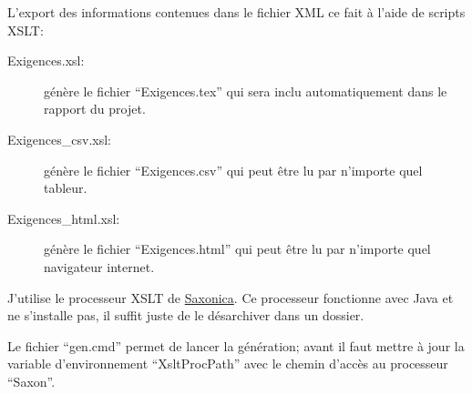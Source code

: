 \documentclass[11pt,a4paper,french,twoside,openright]{article}
\begin{document}
L'export des informations contenues dans le fichier XML ce fait à l'aide de scripts XSLT:
\begin{description}
\item[Exigences.xsl:] génère le fichier \enquote{Exigences.tex} qui sera inclu automatiquement dans le rapport du projet.
\item[Exigences\_csv.xsl:] génère le fichier \enquote{Exigences.csv} qui peut être lu par n'importe quel tableur.
\item[Exigences\_html.xsl:] génère le fichier \enquote{Exigences.html} qui peut être lu par n'importe quel navigateur internet.
\end{description}

J'utilise le processeur XSLT de \href{http://www.saxonica.com/download/opensource.xml}{Saxonica}. Ce processeur fonctionne avec Java et ne s'installe pas, il suffit juste de le désarchiver dans un dossier.

Le fichier \enquote{gen.cmd} permet de lancer la génération; avant il faut mettre à jour la variable d'environnement
\enquote{XsltProcPath} avec le chemin d'accès au processeur \enquote{Saxon}.
\end{document}
